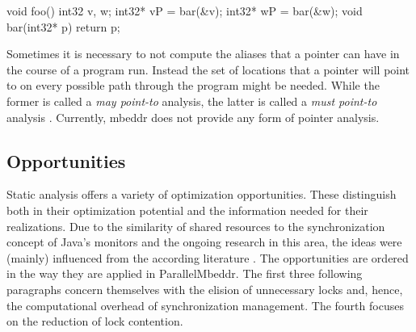 \begin{ccode}
void foo() {
  int32 v, w;
  int32* vP = bar(&v);
  int32* wP = bar(&w);
}
void bar(int32* p) {
  return p;
}
\end{ccode}
Sometimes it is necessary to not compute the aliases that a pointer can have in the course of a program run. Instead the set of locations that a pointer will point to on every possible path through the program might be needed. While the former is called a \textit{may point-to} analysis, the latter is called a \textit{must point-to} analysis \cite{ProgramAnalysisAndSpecialization}.
Currently, mbeddr does not provide any form of pointer analysis.

\subsection{Opportunities}
Static analysis offers a variety of optimization opportunities. These distinguish both in their optimization potential and the information needed for their realizations. Due to the similarity of shared resources to the synchronization concept of Java's monitors and the ongoing research in this area, the ideas were (mainly) influenced from the according literature \cite{StaticAnalysesForJava}\cite{JavaTheoryAndPractice}\cite{DoJava6Threading}. The opportunities are ordered in the way they are applied in ParallelMbeddr. The first three following paragraphs concern themselves with the elision of unnecessary locks and, hence, the computational overhead of synchronization management. The fourth focuses on the reduction of lock contention.

